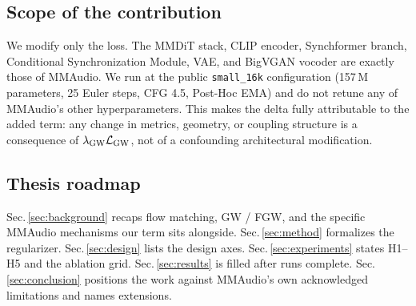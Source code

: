 \subsection{Scope of the contribution}
We modify only the loss. The MMDiT stack, CLIP encoder,
Synchformer branch, Conditional Synchronization Module, VAE,
and BigVGAN \citep{lee2023bigvgan} vocoder are exactly those of
MMAudio. We run at the public \texttt{small\_16k}
configuration (157\,M parameters, 25 Euler steps, CFG 4.5, Post-Hoc
EMA) and do not retune any of MMAudio's other hyperparameters.
This makes the delta fully attributable to the added term:
any change in metrics, geometry, or coupling structure is a
consequence of $\lambda_{\mathrm{GW}} \mathcal{L}_{\mathrm{GW}}$, not of a confounding
architectural modification.

\subsection{Thesis roadmap}
Sec.\,\ref{sec:background} recaps flow matching, GW / FGW, and
the specific MMAudio mechanisms our term sits alongside.
Sec.\,\ref{sec:method} formalizes the regularizer.
Sec.\,\ref{sec:design} lists the design axes.
Sec.\,\ref{sec:experiments} states H1--H5 and the ablation grid.
Sec.\,\ref{sec:results} is filled after runs complete.
Sec.\,\ref{sec:conclusion} positions the work against MMAudio's
own acknowledged limitations and names extensions.
